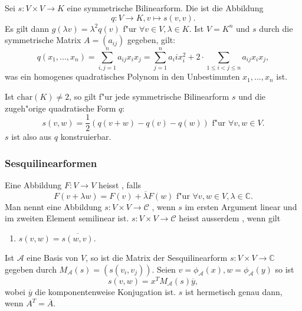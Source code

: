 \documentclass[9pt, a4paper, twocolumn, landscape]{article}
\begin{document}
\begin{definition}
Sei $s: V \times V \rightarrow K$ eine symmetrische Bilinearform. Die  ist die Abbildung
\begin{equation*}
q : V \rightarrow K, v \mapsto s(v, v).
\end{equation*}
Es gilt dann $g(\lambda v) = \lambda^2 q(v)$ f"ur  $\forall v \in V, \lambda \in K$.
Ist $V = K^n$ und $s$ durch die symmetrische Matrix $A = (a_{ij})$ gegeben, gilt:
\begin{equation*}
q(x_1, ..., x_n) = \sum\limits_{i, j = 1}^n a_{ij} x_i x_j = \sum\limits_{j = 1}^n a_ii x_i^2 + 2 \cdot \sum\limits_{1 \leq i < j \leq n} a_{ij}x_ix_j,
\end{equation*}
was ein homogenes quadratisches Polynom in den Unbestimmten $x_1, ..., x_n$ ist.
\end{definition}

\begin{theorem} 
Ist $\textrm{char}(K) \neq 2$, so gilt f"ur jede symmetrische Bilinearform $s$ und die zugeh"orige quadratische Form $q$:
\begin{equation*}
s(v, w) = \frac{1}{2}(q(v+w)-q(v)-q(w)) \text{ f"ur } \forall v, w \in V.
\end{equation*}
$s$ ist also aus $q$ konstruierbar.
\end{theorem}


\subsubsection{Sesquilinearformen}
\begin{definition}
Eine Abbildung $F:V \rightarrow V$ heisst , falls 
\begin{equation*}
F(v + \lambda w) = F(v ) + \overline{\lambda} F(w) \text{ f"ur } \forall v, w \in V, \lambda \in \mathbb{C}.
\end{equation*}
Man nennt eine Abbildung $s: V \times V \rightarrow \mathcal{C}$ , wenn $s$ im ersten Argument linear und im zweiten Element semilinear ist.
$s : V \times V \rightarrow \mathcal{C}$ heisst ausserdem , wenn gilt
\begin{enumerate}
\item[\bt{H}] $s(v, w) = \overline{s(w, v)}.$
\end{enumerate}
\end{definition}


\begin{remark}
Ist $\mathcal{A}$ eine Basis von $V$, so ist die Matrix der Sesquilinearform $s : V \times V \rightarrow \mathbb{C}$ gegeben durch $M_\mathcal{A}(s) = (s(v_i, v_j)).$
Seien $v = \phi_\mathcal{A}(x), w = \phi_\mathcal{A} (y)$ so ist 
\begin{equation*}
s(v, w) = x^T M_\mathcal{A}(s) \overline{y},
\end{equation*}
wobei $\overline{y}$ die komponentenweise Konjugation ist.
$s$ ist hermetisch genau dann, wenn 
$A^T = \overline{A}$.
\end{remark}
\end{document}
